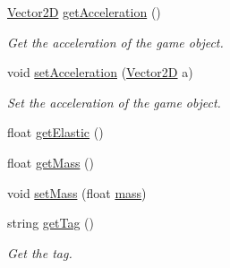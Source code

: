 \begin{DoxyCompactItemize}
\mbox{\label{class_game_object_a55b5a959b75b19e125da0ec910961924}} 
\mbox{\hyperlink{struct_vector2_d}{Vector2D}} \mbox{\hyperlink{class_game_object_a55b5a959b75b19e125da0ec910961924}{get\+Acceleration}} ()
\begin{DoxyCompactList}\small\item\em Get the acceleration of the game object. \end{DoxyCompactList}\item 
void \mbox{\hyperlink{class_game_object_a575ad61234d55aae9f3c6dd1ad7207bd}{set\+Acceleration}} (\mbox{\hyperlink{struct_vector2_d}{Vector2D}} a)
\begin{DoxyCompactList}\small\item\em Set the acceleration of the game object. \end{DoxyCompactList}\item 
float \mbox{\hyperlink{class_game_object_a0561027ef00b15b7126a4eb2a6883ac5}{get\+Elastic}} ()
\item 
float \mbox{\hyperlink{class_game_object_acb377b485652244e2558128575fb532e}{get\+Mass}} ()
\item 
void \mbox{\hyperlink{class_game_object_a71e7ea8def01d23f1696ba00a9669dc5}{set\+Mass}} (float \mbox{\hyperlink{class_game_object_acce2dc8ab8ad6c7ad39ded2cb2aee78f}{mass}})
\item 
\mbox{\label{class_game_object_a099a32d11225032f9a1a35d15a307a27}} 
string \mbox{\hyperlink{class_game_object_a099a32d11225032f9a1a35d15a307a27}{get\+Tag}} ()
\begin{DoxyCompactList}\small\item\em Get the tag. \end{DoxyCompactList}\end{DoxyCompactItemize}
